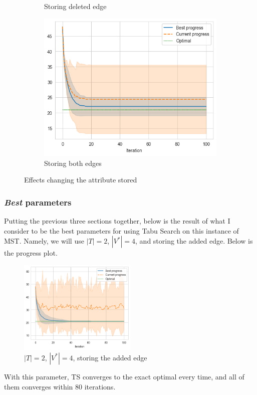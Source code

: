 \begin{figure}[ht]
\begin{subfigure}{0.32\textwidth}
        \caption{Storing deleted edge}
    \end{subfigure}
    \hfill
    \begin{subfigure}{0.32\textwidth}
        \centering
        \includegraphics[width=\textwidth]{../images/p1/both34s.png}
        \caption{Storing both edges}
    \end{subfigure}
    \hfill

    \caption{Effects changing the attribute stored}
    \label{fig:p1-change-attr}
\end{figure}

\subsubsection{\textit{Best} parameters}

Putting the previous three sections together, below is the result of what I consider to be the best parameters for using Tabu Search on this instance of MST. Namely, we will use \(|T| = 2\), \(|V^*| = 4\), and storing the added edge. Below is the progress plot.

\begin{figure}[ht]
    \centering
    \includegraphics[width=0.5\textwidth]{../images/p1/best.png}
    \caption{\(|T| = 2\), \(|V^*| = 4\), storing the added edge}
    \label{fig:p1-best}
\end{figure}

With this parameter, TS converges to the exact optimal every time, and all of them converges within 80 iterations.
